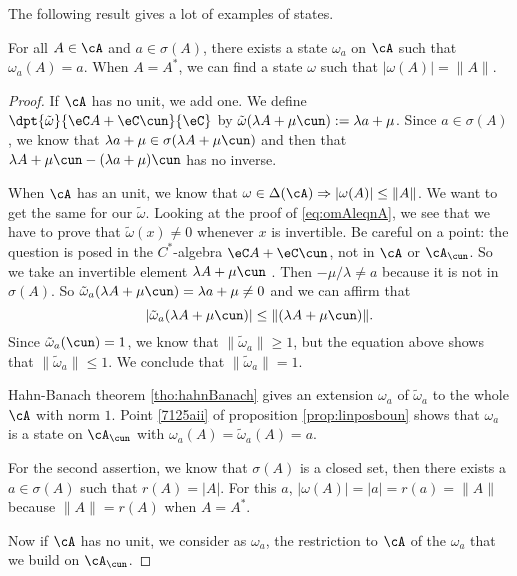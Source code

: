 The following result gives a lot of examples of states.

\begin{lemma}
 For all $A\in \cA$ and $a\in\sigma(A)$, there exists a state $\omega_a$ on $\cA$ such that $\omega_a(A)=a$. When $A=A^*$, we can find a state $\omega$ such that $| \omega(A) |=\| A \|$. \label{lem:omAenomA}
\end{lemma}


\begin{proof}
If $\cA$ has no unit, we add one. We define $\dpt{\tilde\omega}{\eC A+\eC\cun}{\eC}$ by $\tilde\omega(\lambda A+\mu\cun):=\lambda a+\mu$. Since $a\in\sigma(A)$, we know that $\lambda a+\mu\in\sigma(\lambda A+\mu\cun)$ and then that $\lambda A+\mu\cun-(\lambda  a+\mu)\cun$ has no inverse. 

When $\cA$ has an unit, we know that $\omega\in\Delta(\cA)\Rightarrow | \omega(A) |\leq \| A \|$. We want to get the same for our $\tilde\omega$. Looking at the proof of \eqref{eq:omAleqnA}, we see that we have to prove that $\tilde\omega(x)\neq 0$ whenever $x$ is invertible. Be careful on a point: the question is posed in the $C^*$-algebra $\eC A+\eC\cun$, not in $\cA$ or $\cA_{\cun}$. So we take an invertible element $\lambda A+\mu\cun$ . Then $-\mu/\lambda\neq a$ because it is not in $\sigma(A)$. So $\tilde\omega_a(\lambda A+\mu\cun)=\lambda a+\mu\neq 0$ and we can affirm that
\begin{equation}
| \tilde\omega_a(\lambda A+\mu\cun) |\leq \| (\lambda A+\mu\cun) \|.
\end{equation}
Since $\tilde\omega_a(\cun)=1$, we know that $\| \tilde\omega_a \|\geq 1$, but the equation above shows that $\| \tilde\omega_a \|\leq 1$. We conclude that $\| \tilde\omega_a \|=1$.

Hahn-Banach theorem \ref{tho:hahnBanach} gives an extension $\omega_a$ of $\tilde\omega_a$ to the whole $\cA$ with norm $1$. 
Point \ref{7125aii} of proposition \ref{prop:linposboun} shows that $\omega_a$ is a state on $\cA_{\cun}$ with $\omega_a(A)=\tilde\omega_a(A)=a$. 

For the second assertion, we know that $\sigma(A)$ is a closed set, then there exists a $a\in\sigma(A)$ such that $r(A)=| A |$. For this $a$, $| \omega(A) |=| a |=r(a)=\| A \|$ because $\| A \|=r(A)$ when $A=A^*$. 

Now if $\cA$ has no unit, we consider as $\omega_a$, the restriction to $\cA$ of the $\omega_a$ that we build on $\cA_{\cun}$.

\end{proof}

